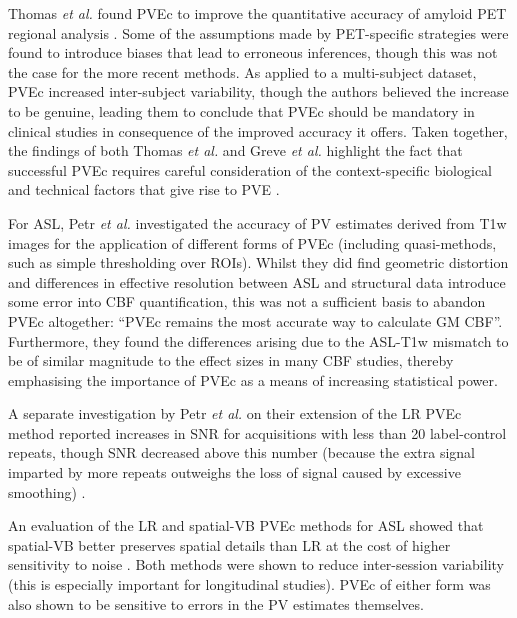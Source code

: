 Thomas \textit{et al.} found PVEc to improve the quantitative accuracy of amyloid PET regional analysis \cite{Thomas2011}. Some of the assumptions made by PET-specific strategies were found to introduce biases that lead to erroneous inferences, though this was not the case for the more recent methods. As applied to a multi-subject dataset, PVEc increased inter-subject variability, though the authors believed the increase to be genuine, leading them to conclude that PVEc should be mandatory in clinical studies in consequence of the improved accuracy it offers. Taken together, the findings of both Thomas \textit{et al.} and Greve \textit{et al.} highlight the fact that successful PVEc requires careful consideration of the context-specific biological and technical factors that give rise to PVE \cite{Thomas2011, Greve2016}. 

For ASL, Petr \textit{et al.} \cite{Petr2018} investigated the accuracy of PV estimates derived from T1w images for the application of different forms of PVEc (including quasi-methods, such as simple thresholding over ROIs). Whilst they did find geometric distortion and differences in effective resolution between ASL and structural data introduce some error into CBF quantification, this was not a sufficient basis to abandon PVEc altogether: ``PVEc remains the most accurate way to calculate GM CBF''. Furthermore, they found the differences arising due to the ASL-T1w mismatch to be of similar magnitude to the effect sizes in many CBF studies, thereby emphasising the importance of PVEc as a means of increasing statistical power. 

A separate investigation by Petr \textit{et al.} on their extension of the LR PVEc method reported increases in SNR for acquisitions with less than 20 label-control repeats, though SNR decreased above this number (because the extra signal imparted by more repeats outweighs the loss of signal caused by excessive smoothing) \cite{Petr2010}. 

An evaluation of the LR and spatial-VB PVEc methods for ASL showed that spatial-VB better preserves spatial details than LR at the cost of higher sensitivity to noise \cite{Zhao2017a}. Both methods were shown to reduce inter-session variability (this is especially important for longitudinal studies). PVEc of either form was also shown to be sensitive to errors in the PV estimates themselves. 

